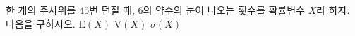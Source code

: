 한 개의 주사위를 $45$번 던질 때, $6$의 약수의 눈이 나오는 횟수를 확률변수 $X$라 하자. 다음을 구하시오.
 $\mathrm{E}(X)$
 $\mathrm{V}(X)$
 $\sigma(X)$
